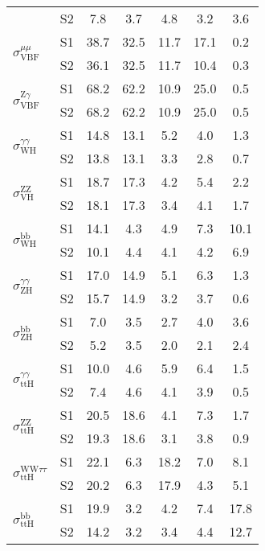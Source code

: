 \begin{tabular}{@{} l c c@{\hskip 0.15in} c c c c @{}}
  & S2 &7.8   & 3.7   & 4.8   & 3.2   & 3.6  \\[4pt]
  \multirow{2}{*}{$\sigma_{\mathrm{VBF}}^{\mu \mu }$} & S1 &38.7  & 32.5  & 11.7  & 17.1  & 0.2  \\[1pt]
  & S2 &36.1  & 32.5  & 11.7  & 10.4  & 0.3  \\[4pt]
  \multirow{2}{*}{$\sigma_{\mathrm{VBF}}^{\mathrm{Z} \gamma }$} & S1 &68.2  & 62.2  & 10.9  & 25.0  & 0.5  \\[1pt]
  & S2 &68.2  & 62.2  & 10.9  & 25.0  & 0.5  \\[4pt]
  \multirow{2}{*}{$\sigma_{\mathrm{WH}}^{\gamma \gamma }$} & S1 &14.8  & 13.1  & 5.2   & 4.0   & 1.3  \\[1pt]
  & S2 &13.8  & 13.1  & 3.3   & 2.8   & 0.7  \\[4pt]
  \multirow{2}{*}{$\sigma_{\mathrm{VH}}^{\mathrm{ZZ}}$} & S1 &18.7  & 17.3  & 4.2   & 5.4   & 2.2  \\[1pt]
  & S2 &18.1  & 17.3  & 3.4   & 4.1   & 1.7  \\[4pt]
  \multirow{2}{*}{$\sigma_{\mathrm{WH}}^{\mathrm{bb}}$} & S1 &14.1  & 4.3   & 4.9   & 7.3   & 10.1 \\[1pt]
  & S2 &10.1  & 4.4   & 4.1   & 4.2   & 6.9  \\[4pt]
  \multirow{2}{*}{$\sigma_{\mathrm{ZH}}^{\gamma \gamma }$} & S1 &17.0  & 14.9  & 5.1   & 6.3   & 1.3  \\[1pt]
  & S2 &15.7  & 14.9  & 3.2   & 3.7   & 0.6  \\[4pt]
  \multirow{2}{*}{$\sigma_{\mathrm{ZH}}^{\mathrm{bb}}$} & S1 &7.0   & 3.5   & 2.7   & 4.0   & 3.6  \\[1pt]
  & S2 &5.2   & 3.5   & 2.0   & 2.1   & 2.4  \\[4pt]
  \multirow{2}{*}{$\sigma_{\mathrm{ttH}}^{\gamma \gamma }$} & S1 &10.0  & 4.6   & 5.9   & 6.4   & 1.5  \\[1pt]
  & S2 &7.4   & 4.6   & 4.1   & 3.9   & 0.5  \\[4pt]
  \multirow{2}{*}{$\sigma_{\mathrm{ttH}}^{\mathrm{ZZ}}$} & S1 &20.5  & 18.6  & 4.1   & 7.3   & 1.7  \\[1pt]
  & S2 &19.3  & 18.6  & 3.1   & 3.8   & 0.9  \\[4pt]
  \multirow{2}{*}{$\sigma_{\mathrm{ttH}}^{\mathrm{WW} \tau \tau}$} & S1 &22.1  & 6.3   & 18.2  & 7.0   & 8.1  \\[1pt]
  & S2 &20.2  & 6.3   & 17.9  & 4.3   & 5.1  \\[4pt]
  \multirow{2}{*}{$\sigma_{\mathrm{ttH}}^{\mathrm{bb}}$} & S1 &19.9  & 3.2   & 4.2   & 7.4   & 17.8 \\[1pt]
  & S2 &14.2  & 3.2   & 3.4   & 4.4   & 12.7 \\[4pt]
  \hline
\end{tabular}
